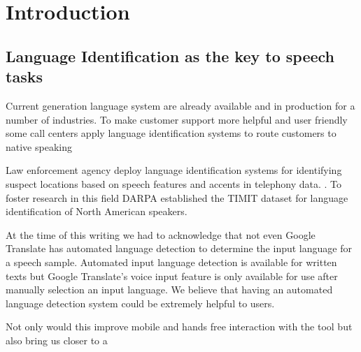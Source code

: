 \section{Introduction}

\subsection{Language Identification as the key to speech tasks}


Current generation language system are already available and in production for a number of industries. To make customer support more helpful and user friendly some call centers apply language identification systems to route customers to native speaking

Law enforcement agency deploy language identification systems for identifying suspect locations based on speech features and accents in telephony data. . To foster research in this field DARPA established the TIMIT dataset for language identification of North American speakers. 

At the time of this writing we had to acknowledge that not even Google Translate has automated language detection to determine the input language for a speech sample. Automated input language detection is available for written texts but Google Translate's voice input feature is only available for use after manually selection an input language. We believe that having an automated language detection system could be extremely helpful to users. 

Not only would this improve mobile and hands free interaction with the tool but also bring us closer to a



